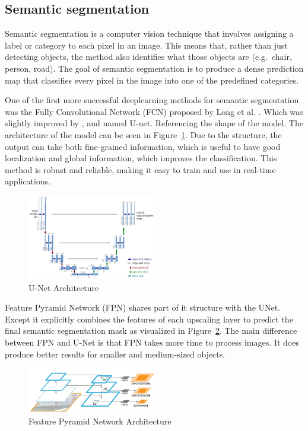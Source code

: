 \subsection{Semantic segmentation}
Semantic segmentation is a computer vision technique that involves assigning a label or category to each pixel in an image. This means that, rather than just detecting objects, the method also identifies what those objects are (e.g.\, chair, person, road). The goal of semantic segmentation is to produce a dense prediction map that classifies every pixel in the image into one of the predefined categories.

One of the first more successful deeplearning methods for semantic segmentation was the Fully Convolutional Network (FCN) proposed by Long et al. \cite{long2015fully}. Which was slightly improved by \cite{ronneberger2015u}, and named U-net. Referencing the shape of the model. The architecture of the model can be seen in Figure~\ref{fig:unet-architecture}. Due to the structure, the output can take both fine-grained information, which is useful to have good localization and global information, which improves the classification. This method is robust and reliable, making it easy to train and use in real-time applications.
\begin{figure}[ht]
    \centering
    \includegraphics[width=0.5\textwidth]{figures/unet-architecture.png}
    \caption{U-Net Architecture \cite{ronneberger2015u}}
    \label{fig:unet-architecture}
\end{figure}

Feature Pyramid Network (FPN) \cite{lin2017feature} shares part of it structure with the UNet. Except it explicitly combines the features of each upscaling layer to predict the final semantic segmentation mask as visualized in Figure~\ref{fig:fpn-architecture}. The main difference between FPN and U-Net is that FPN takes more time to process images. It does produce better results for smaller and medium-sized objects.

\begin{figure}[ht]
    \centering
    \includegraphics[width=0.5\textwidth]{figures/fpn-architecture.png}
    \caption{Feature Pyramid Network Architecture \cite{lin2017feature}}
    \label{fig:fpn-architecture}
\end{figure}

